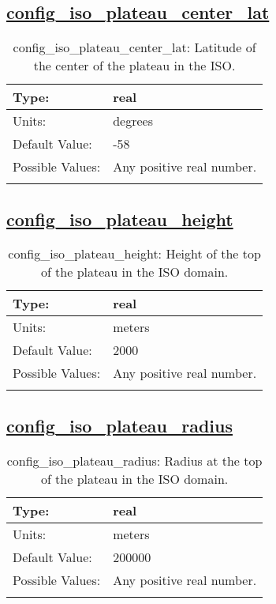 \subsection[config\_iso\_plateau\_center\_lat]{\hyperref[sec:nm_tab_iso]{config\_iso\_plateau\_center\_lat}}
\label{subsec:nm_sec_config_iso_plateau_center_lat}
\begin{center}
\begin{longtable}{| p{2.0in} || p{4.0in} |}
    \hline
    Type: & real \\
    \hline
    Units: & \si{degrees} \\
    \hline
    Default Value: & -58 \\
    \hline
    Possible Values: & Any positive real number. \\
    \hline
    \caption{config\_iso\_plateau\_center\_lat: Latitude of the center of the plateau in the ISO.}
\end{longtable}
\end{center}
\subsection[config\_iso\_plateau\_height]{\hyperref[sec:nm_tab_iso]{config\_iso\_plateau\_height}}
\label{subsec:nm_sec_config_iso_plateau_height}
\begin{center}
\begin{longtable}{| p{2.0in} || p{4.0in} |}
    \hline
    Type: & real \\
    \hline
    Units: & \si{meters} \\
    \hline
    Default Value: & 2000 \\
    \hline
    Possible Values: & Any positive real number. \\
    \hline
    \caption{config\_iso\_plateau\_height: Height of the top of the plateau in the ISO domain.}
\end{longtable}
\end{center}
\subsection[config\_iso\_plateau\_radius]{\hyperref[sec:nm_tab_iso]{config\_iso\_plateau\_radius}}
\label{subsec:nm_sec_config_iso_plateau_radius}
\begin{center}
\begin{longtable}{| p{2.0in} || p{4.0in} |}
    \hline
    Type: & real \\
    \hline
    Units: & \si{meters} \\
    \hline
    Default Value: & 200000 \\
    \hline
    Possible Values: & Any positive real number. \\
    \hline
    \caption{config\_iso\_plateau\_radius: Radius at the top of the plateau in the ISO domain.}
\end{longtable}
\end{center}
